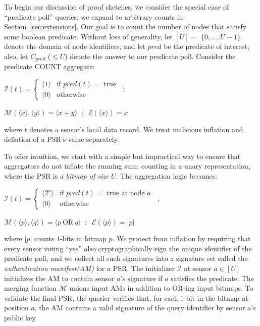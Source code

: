 \documentclass[10pt,twocolumn]{article}
\newcommand{\amfm}{AM-FM\xspace}
\newcommand{\proofsketches}{proof sketches\xspace}
\newcommand{\am}{authentication manifest\xspace}
\newcommand{\cpred}{\ensuremath{C_\mathit{pred}}\xspace}
\newcommand{\pred}{\ensuremath{\mathit{pred}}\xspace}
\newcommand\calI{{\mathcal I}}
\begin{document}
\Section{\amfm Proof Sketches}
\label{sec:count}
\label{sec:amfm}
\vspace{-1em}
To begin our discussion of \proofsketches, we consider the special
case of ``predicate poll'' queries;  we expand to arbitrary counts in Section~\ref{sec:extensions}.
Our goal is to count the number of nodes that satisfy some boolean predicate.
Without loss of generality, let $[U]=$ $\{0,\ldots, U-1\}$ denote the domain
of node identifiers, and let $\mathit{pred}$ be the predicate of 
interest; also, let $\cpred$ ($\leq U$)  denote the answer to our predicate
poll. Consider the predicate COUNT aggregate:\\
%
\centerline{\small$\mathcal{I}(t) = \left\{\begin{array}{ll}
                                       \langle 1\rangle  & \mbox{if $\pred(t)=$ true}\\
                                       \langle 0\rangle   & \mbox{otherwise}
                                      \end{array}\right.
 \;\;;$}
\centerline{\small$\mathcal{M}(\langle x\rangle , \langle y\rangle ) = \langle x + y\rangle  \;\;;
\;\; \mathcal{E}(\langle x\rangle ) = x$}
where $t$ denotes a sensor's local data record.
We treat malicious inflation and deflation of a PSR's value separately.



\label{sec:inflation}
\vspace{-1em}
To offer intuition, we start with a simple but impractical way to ensure
that aggregators do not inflate the running sum: counting in a unary
representation, where the PSR is a
\emph{bitmap of size} $U$. The aggregation logic becomes:\\
\centerline{\small$\mathcal{I}(t) =
                                \left\{\begin{array}{ll}
                                       \langle 2^a\rangle  & \mbox{if $\pred(t)=$ true at node $a$}\\
                                       \langle 0\rangle   & \mbox{otherwise}
                                      \end{array}\right.  \;\;;$}
\centerline{\small$\mathcal{M}(\langle p\rangle , \langle q\rangle ) = \langle p \mathrm{\ OR\ } q\rangle  \;\;;\;\;
  \mathcal{E}(\langle p\rangle ) = |p|$} where $|p|$ counts $1$-bits in bitmap $p$.
We protect from inflation by requiring that every sensor voting ``yes''
  also cryptographically sign the unique identifier of the predicate poll,
and we collect all such signatures into a signature set called the \emph{\am (AM)} for a PSR.
The initializer $\mathcal{I}$ at sensor
$a \in [U]$ initializes the AM to contain sensor $a$'s signature if $a$
  satisfies the predicate. The merging
  function $\mathcal{M}$ unions input AMs in addition to OR-ing
input bitmaps.  To validate the final PSR, the querier verifies that, for
each $1$-bit in the bitmap at position $a$, the AM contains a valid
  signature of the query identifier by sensor $a$'s public key.
\end{document}
